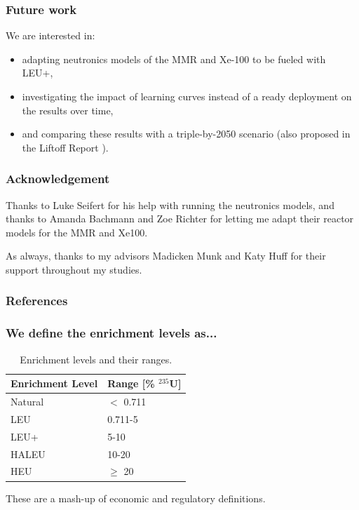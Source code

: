 \documentclass[9pt]{beamer}
\begin{document}
  \begin{frame}
    \frametitle{Future work}
    We are interested in:
    \begin{itemize}
      \item adapting neutronics models of the MMR and Xe-100 to be fueled with LEU+,
      \item investigating the impact of learning curves instead of a ready deployment on the results over time,
      \item and comparing these results with a triple-by-2050 scenario (also proposed in the Liftoff Report \cite{julie_liftoff_pathways_2024}).
    \end{itemize}
  \end{frame}


  \begin{frame}
    \frametitle{Acknowledgement}


      Thanks to Luke Seifert for his help with running the neutronics models, and thanks to Amanda Bachmann and Zoe Richter for letting me adapt their reactor models for the MMR and Xe100.

      \vspace{7mm}
      As always, thanks to my advisors Madicken Munk and Katy Huff for their support throughout my studies.
  \end{frame}


\begin{frame}[allowframebreaks]
  \frametitle{References}
  
  {\footnotesize  }

\end{frame}

\appendix

 \begin{frame}
    \frametitle{We define the enrichment levels as...}
    \begin{table}[H]
        \centering
        \caption{Enrichment levels and their ranges.}
        \label{tab:enrichment_levels}
        \begin{tabular}{l l}
           \hline
           \textbf{Enrichment Level} & \textbf{Range [\%  $^{235}$U]} \\
           \hline
           Natural & $<$ 0.711 \\
           LEU & 0.711-5 \\
           LEU+ & 5-10 \\
           HALEU & 10-20 \\
           HEU & $\geq$ 20  \\
           \hline
        \end{tabular}
     \end{table}
     \vspace{8pt}
     These are a mash-up of economic and regulatory definitions.
  \end{frame}
\end{document}
